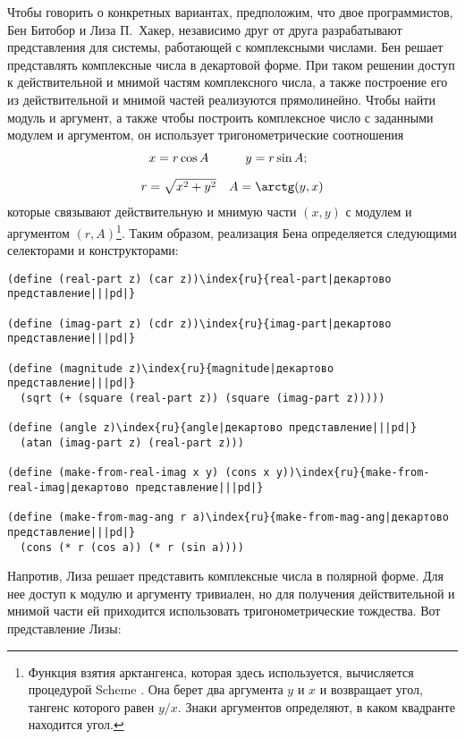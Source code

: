 Чтобы говорить о конкретных вариантах, предположим, что
двое программистов, Бен Битобор и Лиза П.~Хакер, независимо
друг от друга разрабатывают представления для системы, работающей с
комплексными числами.  Бен решает представлять комплексные числа в
декартовой форме.  При
таком решении доступ к действительной и мнимой 
частям комплексного числа, а также построение его из действительной и
мнимой частей  реализуются прямолинейно.  Чтобы найти модуль и
аргумент, а также чтобы построить комплексное число с заданными модулем 
и аргументом, он использует тригонометрические соотношения
$$
\begin{array}{cc}
x = r \cos A & y = r \sin A; \\[10pt]
r = \sqrt{x^2 + y^2}& A = \arctg (y, x)
\end{array}
$$
которые связывают действительную и мнимую части $(x, y)$ с
модулем и аргументом $(r, A)$\footnote{Функция взятия  
арктангенса, которая здесь 
используется, вычисляется процедурой Scheme .
Она берет два аргумента $y$ и $x$ и возвращает угол, 
тангенс которого равен $y/x$.   Знаки аргументов
определяют, в каком квадранте находится угол.}.
Таким образом, реализация Бена определяется следующими селекторами и
конструкторами: 

\begin{Verbatim}[fontsize=\small]
(define (real-part z) (car z))\index{ru}{real-part|декартово представление|||pd|}

(define (imag-part z) (cdr z))\index{ru}{imag-part|декартово представление|||pd|}

(define (magnitude z)\index{ru}{magnitude|декартово представление|||pd|}
  (sqrt (+ (square (real-part z)) (square (imag-part z)))))

(define (angle z)\index{ru}{angle|декартово представление|||pd|}
  (atan (imag-part z) (real-part z)))

(define (make-from-real-imag x y) (cons x y))\index{ru}{make-from-real-imag|декартово представление|||pd|}

(define (make-from-mag-ang r a)\index{ru}{make-from-mag-ang|декартово представление|||pd|}
  (cons (* r (cos a)) (* r (sin a))))
\end{Verbatim}

Напротив, Лиза решает представить комплексные числа
в полярной форме.  Для нее доступ к модулю и аргументу тривиален, но для
получения действительной и мнимой части ей приходится использовать
тригонометрические тождества.  Вот представление Лизы: 


